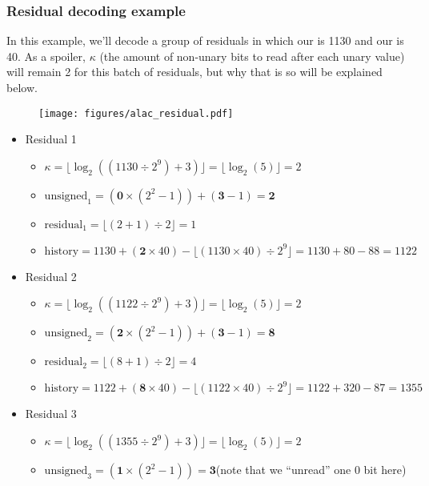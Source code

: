 \clearpage

\subsubsection{Residual decoding example}

In this example, we'll decode a group of residuals in which our
 is 1130 and our  is 40.
As a spoiler, $\kappa$ (the amount of non-unary bits to read
after each unary value) will remain 2 for this batch of residuals,
but why that is so will be explained below.

\begin{figure}[h]
\texttt{[image: figures/alac\_residual.pdf]}
\end{figure}
\begin{itemize}
\setlength{\itemsep}{0in}
\setlength{\parskip}{0in}
\item Residual 1
\begin{itemize}
\item $\kappa = \lfloor\log_2((1130 \div 2^9) + 3)\rfloor = \lfloor\log_2(5)\rfloor = 2$
\item $\text{unsigned}_1 = (\textbf{0} \times (2^2 - 1)) + (\textbf{3} - 1) = \textbf{2}$
\item $\text{residual}_1 = \lfloor (2 + 1) \div 2 \rfloor = 1$
\item $\text{history} = 1130 + (\textbf{2} \times 40) - \lfloor(1130 \times 40) \div 2^9\rfloor = 1130 + 80 - 88 = 1122$
\end{itemize}
\item Residual 2
\begin{itemize}
\item $\kappa = \lfloor\log_2((1122 \div 2^9) + 3)\rfloor = \lfloor\log_2(5)\rfloor = 2$
\item $\text{unsigned}_2 = (\textbf{2} \times (2^2 - 1)) + (\textbf{3} - 1) = \textbf{8}$
\item $\text{residual}_2 = \lfloor (8 + 1) \div 2 \rfloor = 4$
\item $\text{history} = 1122 + (\textbf{8} \times 40) - \lfloor(1122 \times 40) \div 2^9\rfloor = 1122 + 320 - 87 = 1355$
\end{itemize}
\item Residual 3
\begin{itemize}
\item $\kappa = \lfloor\log_2((1355 \div 2^9) + 3)\rfloor = \lfloor\log_2(5)\rfloor = 2$
\item $\text{unsigned}_3 = (\textbf{1} \times (2^2 - 1)) = \textbf{3}$\hfill (note that we ``unread'' one 0 bit here)

\end{itemize}
\end{itemize}

